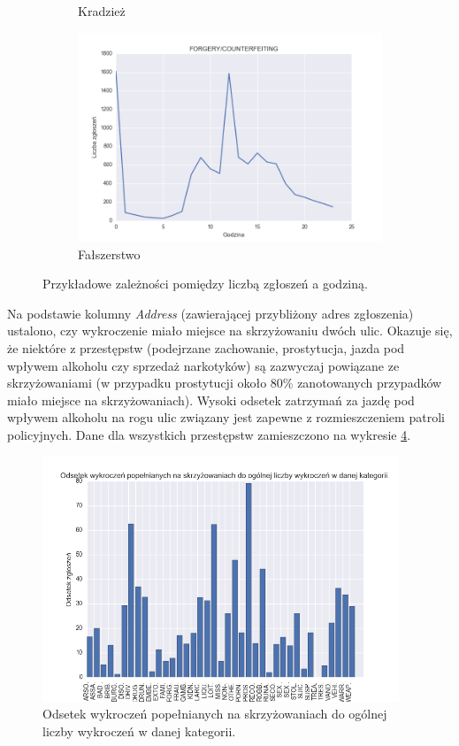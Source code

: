 \documentclass[11pt]{article} %
\begin{document}
\begin{figure}[!h]
\begin{subfigure}{0.48\linewidth}
   \caption{Kradzież}
   \label{fig:crimes_per_hour_5} 
\end{subfigure}
\hfill
\begin{subfigure}{0.48\linewidth}
   \centering
   \includegraphics[width=\linewidth]{images/crimes_per_hour/12}
   \caption{Fałszerstwo}
   \label{fig:crimes_per_hour_6}
\end{subfigure}
\centering
\caption{Przykładowe zależności pomiędzy liczbą zgłoszeń a godziną.} 
\end{figure}

Na podstawie kolumny \textit{Address} (zawierającej przybliżony adres zgłoszenia) ustalono, czy wykroczenie miało miejsce na skrzyżowaniu dwóch ulic. Okazuje się, że niektóre z przestępstw (podejrzane zachowanie, prostytucja, jazda pod wpływem alkoholu czy sprzedaż narkotyków) są zazwyczaj powiązane ze skrzyżowaniami (w przypadku prostytucji około 80\% zanotowanych przypadków miało miejsce na skrzyżowaniach). Wysoki odsetek zatrzymań za jazdę pod wpływem alkoholu na rogu ulic związany jest zapewne z rozmieszczeniem patroli policyjnych. Dane dla wszystkich przestępstw zamieszczono na wykresie \ref{fig:corner}. \\

\begin{figure}[!h]
  \centering
    \includegraphics[width=0.95\textwidth]{images/street_corner}
  \caption{Odsetek wykroczeń popełnianych na skrzyżowaniach do ogólnej liczby wykroczeń w danej kategorii.} \label{fig:corner}
\end{figure}
\end{document}

